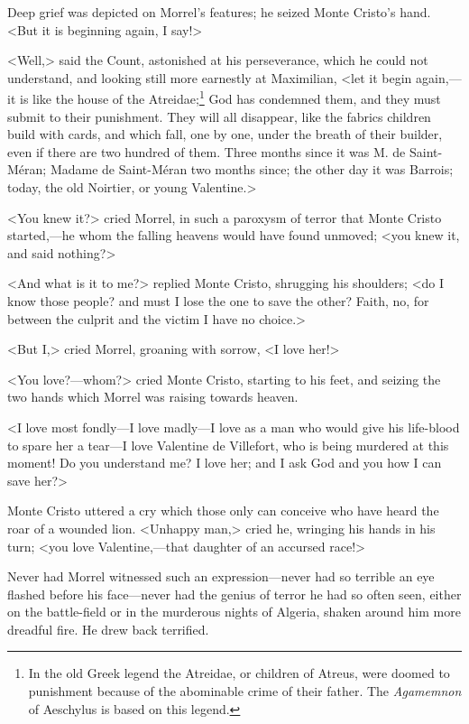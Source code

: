  Deep grief was depicted on Morrel's features; he seized Monte Cristo's hand. <But it is beginning again, I say!> 

 <Well,> said the Count, astonished at his perseverance, which he could not understand, and looking still more earnestly at Maximilian, <let it begin again,—it is like the house of the Atreidae;\footnote{In the old Greek legend the Atreidae, or children of Atreus, were doomed to punishment because of the abominable crime of their father. The \textit{Agamemnon} of Aeschylus is based on this legend.} God has condemned them, and they must submit to their punishment. They will all disappear, like the fabrics children build with cards, and which fall, one by one, under the breath of their builder, even if there are two hundred of them. Three months since it was M. de Saint-Méran; Madame de Saint-Méran two months since; the other day it was Barrois; today, the old Noirtier, or young Valentine.> 

 <You knew it?> cried Morrel, in such a paroxysm of terror that Monte Cristo started,—he whom the falling heavens would have found unmoved; <you knew it, and said nothing?> 

 <And what is it to me?> replied Monte Cristo, shrugging his shoulders; <do I know those people? and must I lose the one to save the other? Faith, no, for between the culprit and the victim I have no choice.> 

 <But I,> cried Morrel, groaning with sorrow, <I love her!> 

 <You love?—whom?> cried Monte Cristo, starting to his feet, and seizing the two hands which Morrel was raising towards heaven. 

 <I love most fondly—I love madly—I love as a man who would give his life-blood to spare her a tear—I love Valentine de Villefort, who is being murdered at this moment! Do you understand me? I love her; and I ask God and you how I can save her?> 

 Monte Cristo uttered a cry which those only can conceive who have heard the roar of a wounded lion. <Unhappy man,> cried he, wringing his hands in his turn; <you love Valentine,—that daughter of an accursed race!> 

 Never had Morrel witnessed such an expression—never had so terrible an eye flashed before his face—never had the genius of terror he had so often seen, either on the battle-field or in the murderous nights of Algeria, shaken around him more dreadful fire. He drew back terrified. 


